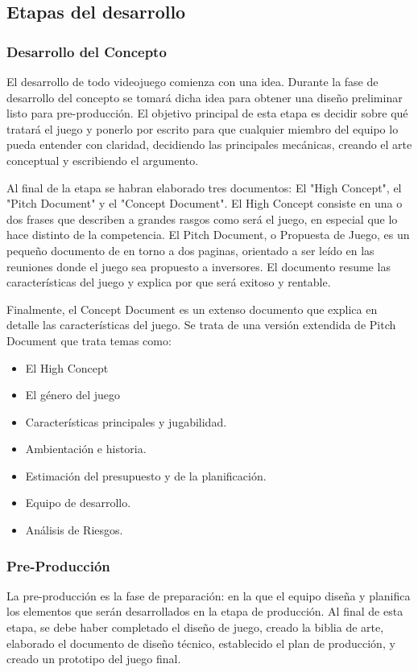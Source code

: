 \subsection{Etapas del desarrollo}
\subsubsection{Desarrollo del Concepto}
El desarrollo de todo videojuego comienza con una idea. Durante la fase de desarrollo del concepto se tomará dicha idea para obtener una diseño preliminar listo para pre-producción. El objetivo principal de esta etapa es decidir sobre qué tratará el juego y ponerlo por escrito para que cualquier miembro del equipo lo pueda entender con claridad, decidiendo las principales mecánicas, creando el arte conceptual y escribiendo el argumento. 

Al final de la etapa se habran elaborado tres documentos: El "High Concept", el "Pitch Document" y el "Concept Document". El High Concept consiste en una o dos frases que describen a grandes rasgos como será el juego, en especial que lo hace distinto de la competencia. El Pitch Document, o Propuesta de Juego, es un pequeño documento de en torno a dos paginas, orientado a ser leído en las reuniones donde el juego sea propuesto a inversores. El documento resume las características del juego y explica por que será exitoso y rentable.

Finalmente, el Concept Document es un extenso documento que explica en detalle las características del juego. Se trata de una versión extendida de Pitch Document que trata temas como: 
\begin{itemize}
\item El High Concept
\item El género del juego
\item Características principales y jugabilidad.
\item Ambientación e historia.
\item Estimación del presupuesto y de la planificación.
\item Equipo de desarrollo.
\item Análisis de Riesgos.
\end{itemize}

\subsubsection{Pre-Producción}
La pre-producción es la fase de preparación: en la que el equipo diseña y planifica los elementos que serán desarrollados en la etapa de producción. Al final de esta etapa, se debe haber completado el diseño de juego, creado la biblia de arte, elaborado el documento de diseño técnico, establecido el plan de producción, y creado un prototipo del juego final.

